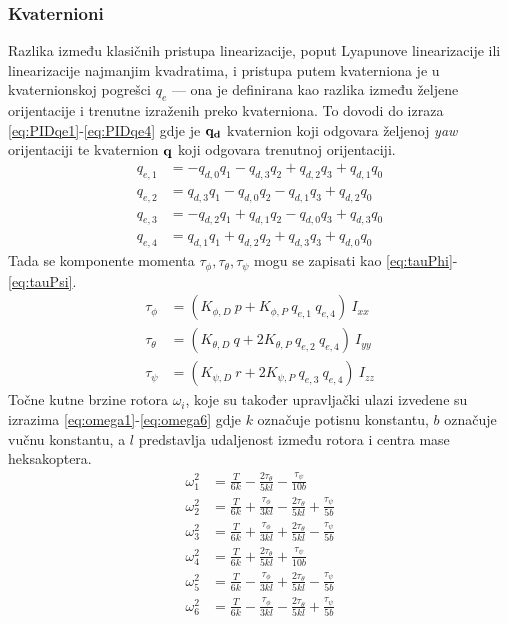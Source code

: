 \documentclass[times, utf8, diplomski]{fer}
\begin{document}
\subsubsection{Kvaternioni}
Razlika između klasičnih pristupa linearizacije, poput Lyapunove linearizacije ili linearizacije najmanjim kvadratima, i pristupa putem kvaterniona je u kvaternionskoj pogrešci $q_e$ --- ona je definirana kao razlika između željene orijentacije i trenutne izraženih preko kvaterniona. To dovodi do izraza \ref{eq:PIDqe1}-\ref{eq:PIDqe4} gdje je $\bf q_d$ kvaternion koji odgovara željenoj \emph{yaw} orijentaciji te kvaternion $\bf q$ koji odgovara trenutnoj orijentaciji. 
\begin{align}
q_{e,1} &= -q_{d,0}q_1 -q_{d,3}q_2 + q_{d,2}q_3 + q_{d,1}q_0 \label{eq:PIDqe1} \\
q_{e,2} &= q_{d,3}q_1 -q_{d,0}q_2 - q_{d,1}q_3 + q_{d,2}q_0 \label{eq:PIDqe2} \\
q_{e,3} &= -q_{d,2}q_1 +q_{d,1}q_2 - q_{d,0}q_3 + q_{d,3}q_0 \label{eq:PIDqe3} \\
q_{e,4} &= q_{d,1}q_1 +q_{d,2}q_2 + q_{d,3}q_3 + q_{d,0}q_0 \label{eq:PIDqe4}
\end{align}
Tada se komponente momenta $\tau_{\phi}, \tau_{\theta},\tau_{\psi}$ mogu se zapisati kao \ref{eq:tauPhi}-\ref{eq:tauPsi}.
\begin{align}
\tau_{\phi} &= (K_{\phi,D}~p + K_{\phi,P}~q_{e,1}~q_{e,4})~I_{xx} \label{eq:tauPhi} \\
\tau_{\theta} &= (K_{\theta,D}~q + 2K_{\theta,P}~q_{e,2}~q_{e,4})~I_{yy} \label{eq:tauTheta} \\
\tau_{\psi} &= (K_{\psi,D}~r + 2K_{\psi,P}~q_{e,3}~q_{e,4})~I_{zz} \label{eq:tauPsi}
\end{align}
Točne kutne brzine rotora $\omega_i$, koje su također upravljački ulazi izvedene su izrazima \ref{eq:omega1}-\ref{eq:omega6} gdje $k$ označuje potisnu konstantu, $b$ označuje vučnu konstantu, a $l$ predstavlja udaljenost između rotora i centra mase heksakoptera.
\begin{align}
\omega^2_1 &= \frac{T}{6k} - \frac{2\tau_{\theta}}{5kl} - \frac{\tau_{\psi}}{10b} \label{eq:omega1} \\
\omega^2_2 &= \frac{T}{6k} + \frac{\tau_{\phi}}{3kl} -\frac{2\tau_{\theta}}{5kl} + \frac{\tau_{\psi}}{5b} \label{eq:omega2} \\
\omega^2_3 &= \frac{T}{6k} + \frac{\tau_{\phi}}{3kl} + \frac{2\tau_{\theta}}{5kl} - \frac{\tau_{\psi}}{5b} \label{eq:omega3} \\
\omega^2_4 &= \frac{T}{6k} + \frac{2\tau_{\theta}}{5kl} + \frac{\tau_{\psi}}{10b} \label{eq:omega4} \\
\omega^2_5 &= \frac{T}{6k} - \frac{\tau_{\phi}}{3kl} + \frac{2\tau_{\theta}}{5kl} - \frac{\tau_{\psi}}{5b} \label{eq:omega5} \\
\omega^2_6 &= \frac{T}{6k} - \frac{\tau_{\phi}}{3kl} -\frac{2\tau_{\theta}}{5kl} + \frac{\tau_{\psi}}{5b} \label{eq:omega6} 
\end{align}
\end{document}
